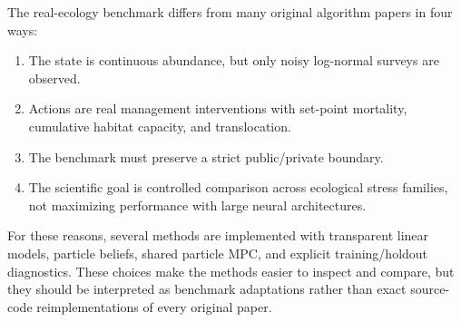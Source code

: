 \documentclass[11pt]{article}
\newcommand{\1}{\mathbf{1}}
\begin{document}
The real-ecology benchmark differs from many original algorithm papers in four
ways:
\begin{enumerate}[leftmargin=*]
  \item The state is continuous abundance, but only noisy log-normal surveys are
  observed.
  \item Actions are real management interventions with set-point mortality,
  cumulative habitat capacity, and translocation.
  \item The benchmark must preserve a strict public/private boundary.
  \item The scientific goal is controlled comparison across ecological stress
  families, not maximizing performance with large neural architectures.
\end{enumerate}

For these reasons, several methods are implemented with transparent linear models,
particle beliefs, shared particle MPC, and explicit training/holdout diagnostics.
These choices make the methods easier to inspect and compare, but they should be
interpreted as benchmark adaptations rather than exact source-code
reimplementations of every original paper.
\end{document}
